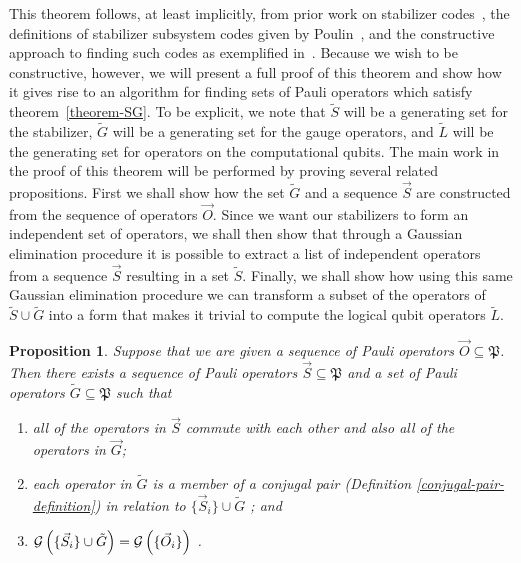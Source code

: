 \documentclass[twocolumn,showpacs,preprintnumbers,amsmath,amssymb,nofootinbib,pra,floatfix]{revtex4-1}
\newtheorem{proposition}{Proposition}
\newenvironment{remark}[1][Remark]{\begin{trivlist}
\item[\hskip \labelsep {\bfseries #1}]}{\end{trivlist}}
\newcommand{\lst}{\vec}
\newcommand{\set}{\tilde}
\newcommand{\genfun}{\mathcal{G}}
\newcommand{\pauligroup}{\mathfrak{P}}
\begin{document}
\begin{remark}
This theorem follows, at least implicitly, from prior work on stabilizer codes~\cite{Gottesman:97a}, the definitions of stabilizer subsystem codes given by Poulin~\cite{Poulin:05a}, and the constructive approach to finding such codes as exemplified in~\cite{Bacon:06a}.  Because we wish to be constructive, however, we will present a full proof of this theorem and show how it gives rise to an algorithm for finding sets of Pauli operators which satisfy theorem~\ref{theorem-SG}.  To be explicit, we note that $\set S$ will be a generating set for the stabilizer, $\set G$ will be a generating set for the gauge operators, and $\set L$ will be the generating set for operators on the computational qubits. The main work in the proof of this theorem will be performed by proving several related propositions.  First we shall show how the set $\set G$ and a sequence $\lst S$ are constructed from the sequence of operators $\lst O$.  Since we want our stabilizers to form an independent set of operators, we shall then show that through a Gaussian elimination procedure it is possible to extract a list of independent operators from a sequence $\lst S$ resulting in a set $\set S$.  Finally, we shall show how using this same Gaussian elimination procedure we can transform a subset of the operators of $\set S\cup\set G$ into a form that makes it trivial to compute the logical qubit operators $\set L$.
\end{remark}
\begin{proposition} \label{proposition-SG} Suppose that we are given a sequence of Pauli operators $\lst O\subseteq \pauligroup$.  Then there exists a sequence of Pauli operators $\lst S\subseteq\pauligroup$ and a set of Pauli operators $\set G\subseteq\pauligroup$ such that
\begin{enumerate}
\item all of the operators in $\lst S$ commute with each other and also all of the operators in $\lst G$; \label{stabs-commute-with-G}
\item each operator in $\set G$ is a member of a \emph{conjugal pair} (Definition \ref{conjugal-pair-definition}) in relation to $\{\lst S_i\} \cup \set G $ \label{conjugal-pairs-commute-with-SAG}; and
\item $\genfun\paren{\{\lst S_i\}\cup \set G}=\genfun\paren{\{\lst O_i\}}$ \label{SAG-spans-all}.
\end{enumerate}
\end{proposition}
\end{document}
